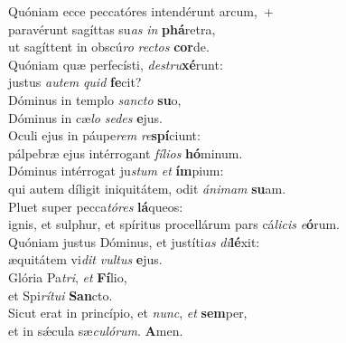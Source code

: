 \evenverse Quóniam ecce peccatóres intendérunt arcum,~+\\\evenverse  paravérunt sagíttas su\textit{as} \textit{in} \textbf{phá}retra,~\*\\
\evenverse ut sagíttent in obscú\textit{ro} \textit{re}\textit{ctos} \textbf{cor}de.\\
\oddverse Quóniam quæ perfecísti, \textit{de}\textit{stru}\textbf{xé}runt:~\*\\
\oddverse justus \textit{au}\textit{tem} \textit{quid} \textbf{fe}cit?\\
\evenverse Dóminus in templo \textit{san}\textit{cto} \textbf{su}o,~\*\\
\evenverse Dóminus in cæ\textit{lo} \textit{se}\textit{des} \textbf{e}jus.\\
\oddverse Oculi ejus in páupe\textit{rem} \textit{re}\textbf{spí}ciunt:~\*\\
\oddverse pálpebræ ejus intérrogant \textit{fí}\textit{li}\textit{os} \textbf{hó}minum.\\
\evenverse Dóminus intérrogat ju\textit{stum} \textit{et} \textbf{ím}pium:~\*\\
\evenverse qui autem díligit iniquitátem, odit \textit{á}\textit{ni}\textit{mam} \textbf{su}am.\\
\oddverse Pluet super pecca\textit{tó}\textit{res} \textbf{lá}queos:~\*\\
\oddverse ignis, et sulphur, et spíritus procellárum pars cá\textit{li}\textit{cis} \textit{e}\textbf{ó}rum.\\
\evenverse Quóniam justus Dóminus, et justíti\textit{as} \textit{di}\textbf{lé}xit:~\*\\
\evenverse æquitátem vi\textit{dit} \textit{vul}\textit{tus} \textbf{e}jus.\\
\oddverse Glória Pa\textit{tri}, \textit{et} \textbf{Fí}lio,~\*\\
\oddverse et Spi\textit{rí}\textit{tu}\textit{i} \textbf{San}cto.\\
\evenverse Sicut erat in princípio, et \textit{nunc}, \textit{et} \textbf{sem}per,~\*\\
\evenverse et in sǽcula sæ\textit{cu}\textit{ló}\textit{rum}. \textbf{A}men.\\
